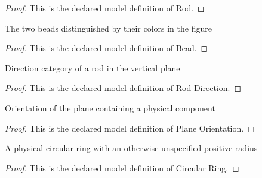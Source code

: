 \begin{proof}
  This is the declared model definition of Rod.
\end{proof}
\begin{definition}[Bead]
  \label{def:physics:phyx-mini-0675:phyxminiproblems-problemphyxmini0675-bead}
  The two beads distinguished by their colors in the figure
\end{definition}
\begin{proof}
  This is the declared model definition of Bead.
\end{proof}
\begin{definition}
  \label{def:physics:phyx-mini-0675:phyxminiproblems-problemphyxmini0675-roddirection}
  Direction category of a rod in the vertical plane
\end{definition}
\begin{proof}
  This is the declared model definition of Rod Direction.
\end{proof}
\begin{definition}
  \label{def:physics:phyx-mini-0675:phyxminiproblems-problemphyxmini0675-planeorientation}
  Orientation of the plane containing a physical component
\end{definition}
\begin{proof}
  This is the declared model definition of Plane Orientation.
\end{proof}
\begin{definition}
  \label{def:physics:phyx-mini-0675:phyxminiproblems-problemphyxmini0675-circularring}
  A physical circular ring with an otherwise unspecified positive radius
\end{definition}
\begin{proof}
  This is the declared model definition of Circular Ring.
\end{proof}
